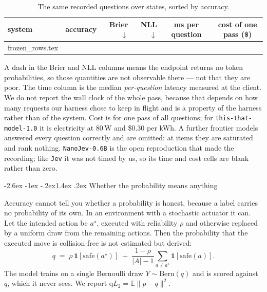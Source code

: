 \documentclass[11pt]{article}
\makeatletter
\newcommand{\rowsfrom}[1]{\@@input #1 }
\renewcommand\subsection{\@startsection{subsection}{2}{\z@}%
  {-2.6ex \@plus -1ex \@minus -.2ex}{1.4ex \@plus.2ex}%
  {\normalfont\normalsize\bfseries\color{accent!85!black}}}
\newenvironment{tabnotes}[1][\textwidth]
  {\par\addvspace{5pt}\begin{minipage}{#1}\footnotesize\setlength{\parindent}{0pt}\raggedright}
  {\end{minipage}\par}
\newcommand{\Ours}{\texttt{this-that-model-1.0}}
\newcommand{\qL}{\mathrm{q}L_2}
\newcommand{\1}{\mathbf{1}}
\makeatother
\begin{document}
\begin{table}[t]
\centering\small
\caption{The same \frozenN{} recorded questions over \frozenStates{} states, sorted by accuracy.}
\label{tab:frozen}
\begin{tabular}{l rrr r@{}l r@{}l}
\toprule
system & accuracy & Brier $\downarrow$ & NLL $\downarrow$
       & \multicolumn{2}{c}{ms per question} & \multicolumn{2}{c}{cost of one pass (\$)} \\
\midrule
\rowsfrom{frozen_rows.tex}
\bottomrule
\end{tabular}
\begin{tabnotes}
A dash in the Brier and NLL columns means the endpoint returns no token probabilities, so those
quantities are not observable there --- not that they are poor. The time column is the median
\emph{per-question} latency measured at the client. We do not report the wall clock of the whole
pass, because that depends on how many requests our harness chose to keep in flight and is a
property of the harness rather than of the system. Cost is for one pass of all \frozenN{}
questions; for \Ours{} it is electricity at 80\,W and \$0.30 per kWh. A further
\frozenSaturated{} frontier models answered every question correctly and are omitted: at \frozenN{}
items they are saturated and rank nothing. \texttt{NanoJev-0.6B} is the open reproduction that made
the recording; like \texttt{Jev} it was not timed by us, so its time and cost cells are
blank rather than zero.
\end{tabnotes}
\end{table}


\subsection{Whether the probability means anything}

Accuracy cannot tell you whether a probability is honest, because a label carries no probability of
its own. In an environment with a stochastic actuator it can. Let the intended action be $a^\star$,
executed with reliability $\rho$ and otherwise replaced by a uniform draw from the remaining
actions. Then the probability that the executed move is collision-free is not estimated but derived:
\begin{equation}
q \;=\; \rho\,\1[\mathrm{safe}(a^\star)]
      \;+\; \frac{1-\rho}{|A|-1}\sum_{a\neq a^\star}\1[\mathrm{safe}(a)] .
\label{eq:q}
\end{equation}
The model trains on a single Bernoulli draw $Y \sim \mathrm{Bern}(q)$ and is scored against $q$,
which it never sees. We report $\qL = \mathbb{E}\lVert p - q\rVert^2$.
\end{document}
